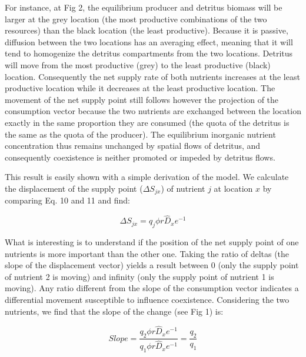 \documentclass[letterpaper,twocolumn,showkeys]{revtex4-1}
\begin{document}
For instance, at Fig 2, the equilibrium producer and detritus biomass will be larger at the grey location (the most productive combinations of the two resources) than the black location (the least productive). Because it is passive, diffusion between the two locations has an averaging effect, meaning that it will tend to homogenize the detritus compartments from the two locations. Detritus will move from the most productive (grey) to the least productive (black) location. Consequently the net supply rate of both nutrients increases at the least productive location  while it decreases at the least productive location. The movement of the net supply point still follows however the projection of the consumption vector because the two nutrients are exchanged between the location exactly in the same proportion they are consumed (the quota of the detritus is the same as the quota of the producer). The equilibrium inorganic nutrient concentration thus remains unchanged by spatial flows of detritus, and consequently coexistence is neither promoted or impeded by detritus flows.

	This result is easily shown with a simple derivation of the model. We calculate the displacement of the supply point ($\Delta S_{jx}$) of nutrient $j$ at location $x$ by comparing Eq. 10 and 11 and find:

\begin{equation}
	\label{e:bnet}
	\Delta S_{jx}=q_{j}\phi r\widehat{D}_{x}e^{-1}
\end{equation}

What is interesting is to understand if the position of the net supply point of one nutrients is more important than the other one. Taking the ratio of deltas (the slope of the displacement vector) yields a result between 0 (only the supply point of nutrient 2 is moving) and infinity (only the supply point of nutrient 1 is moving). Any ratio different from the slope of the consumption vector indicates a differential movement susceptible to influence coexistence. Considering the two nutrients, we find that the slope of the change (see Fig 1) is:

\begin{equation}
	\label{e:bnet}
	Slope=\frac{q_{2}\phi r\widehat{D}_{x}e^{-1}}{q_{1}\phi r\widehat{D}_{x}e^{-1}}=\frac{q_{2}}{q_{1}}
\end{equation}
\end{document}
